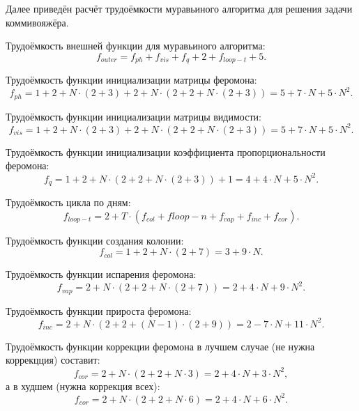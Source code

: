 Далее приведён расчёт трудоёмкости муравьиного алгоритма для решения задачи коммивояжёра. 

Трудоёмкость внешней функции для муравьиного алгоритма:
\begin{equation} \label{eqn:4}
	f_{outer} = f_{ph} + f_{vis} + f_{q} + 2 + f_{loop-t} + 5.
\end{equation}

Трудоёмкость функции инициализации матрицы феромона:
\begin{equation}\label{eqn:5}
	f_{ph} = 1 + 2 + N \cdot (2 + 3) + 2 + N \cdot (2 + 2 + N \cdot(2 + 3)) = 5 + 7 \cdot N + 5 \cdot N^2.
\end{equation}

Трудоёмкость функции инициализации матрицы видимости:
\begin{equation}\label{eqn:6}
	f_{vis} = 1 + 2 + N \cdot (2 + 3) + 2 + N \cdot (2 + 2 + N \cdot(2 + 3)) = 5 + 7 \cdot N + 5 \cdot N^2.
\end{equation}

Трудоёмкость функции инициализации коэффициента пропорциональности феромона:
\begin{equation}\label{eqn:7}
	f_{q} = 1 + 2 + N \cdot (2 + 2 + N \cdot (2 + 3)) + 1 = 4 + 4 \cdot N + 5 \cdot N^2.
\end{equation}

Трудоёмкость цикла по дням:
\begin{equation}\label{eqn:8}
	f_{loop-t} = 2 + T \cdot (f_{col} + f{loop-n} + f_{vap} + f_{inc} + f_{cor}).
\end{equation}

Трудоёмкость функции создания колонии:
\begin{equation}\label{eqn:9}
	f_{col} = 1 + 2 + N \cdot (2 + 7) = 3 + 9 \cdot N.
\end{equation}

Трудоёмкость функции испарения феромона:
\begin{equation}\label{eqn:10}
	f_{vap} = 2 + N \cdot (2 + 2 + N \cdot (2 + 7)) = 2 + 4 \cdot N + 9 \cdot N^2.
\end{equation}

Трудоёмкость функции прироста феромона:
\begin{equation}\label{eqn:11}
	f_{inc} = 2 + N \cdot (2 + 2 + (N - 1) \cdot (2 + 9)) = 2 - 7 \cdot N + 11 \cdot N^2.
\end{equation}

Трудоёмкость функции коррекции феромона в лучшем случае (не нужна коррекцция) составит:
\begin{equation}\label{eqn:12}
	f_{cor} = 2 + N \cdot (2 + 2 + N \cdot 3) = 2 + 4 \cdot N + 3 \cdot N^2,
\end{equation}
а в худшем (нужна коррекция всех):
\begin{equation}\label{eqn:13}
	f_{cor} = 2 + N \cdot (2 + 2 + N \cdot 6) = 2 + 4 \cdot N + 6 \cdot N^2.
\end{equation}

